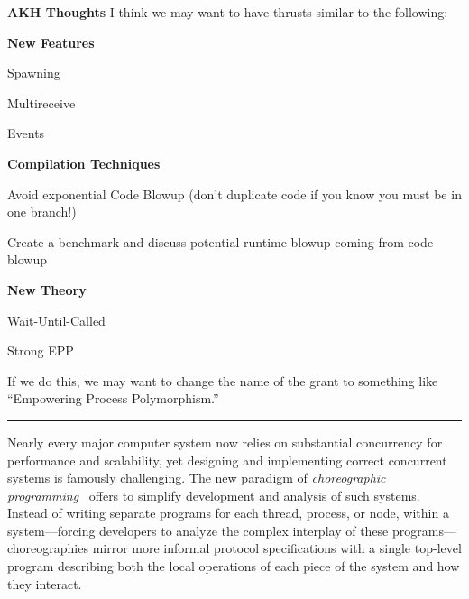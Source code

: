 \noindent\textbf{AKH Thoughts}
I think we may want to have thrusts similar to the following:
\begin{outline}[2]{}
\item \textbf{New Features}
  \begin{lvl}
  \item Spawning
  \item Multireceive 
  \item Events
  \end{lvl}
\item \textbf{Compilation Techniques}
  \begin{lvl}
  \item Avoid exponential Code Blowup (don't duplicate code if you know you must be in one branch!)
  \item Create a benchmark and discuss potential runtime blowup coming from code blowup
  \end{lvl}
\item \textbf{New Theory}
  \begin{lvl}
  \item Wait-Until-Called
  \item Strong EPP 
  \end{lvl}
\end{outline}

If we do this, we may want to change the name of the grant to something like ``Empowering Process Polymorphism.''

\vspace{0.5em}
\hrule
\vspace{0.5em}

Nearly every major computer system now relies on substantial concurrency for performance and scalability,
yet designing and implementing correct concurrent systems is famously challenging.
The new paradigm of \emph{choreographic programming}~\citep{Montesi13,Montesi23} offers to simplify development and analysis of such systems.
Instead of writing separate programs for each thread, process, or node, within a system---forcing developers to analyze the complex interplay of these programs---%
choreographies mirror more informal protocol specifications with a single top-level program
describing both the local operations of each piece of the system and how they interact.


